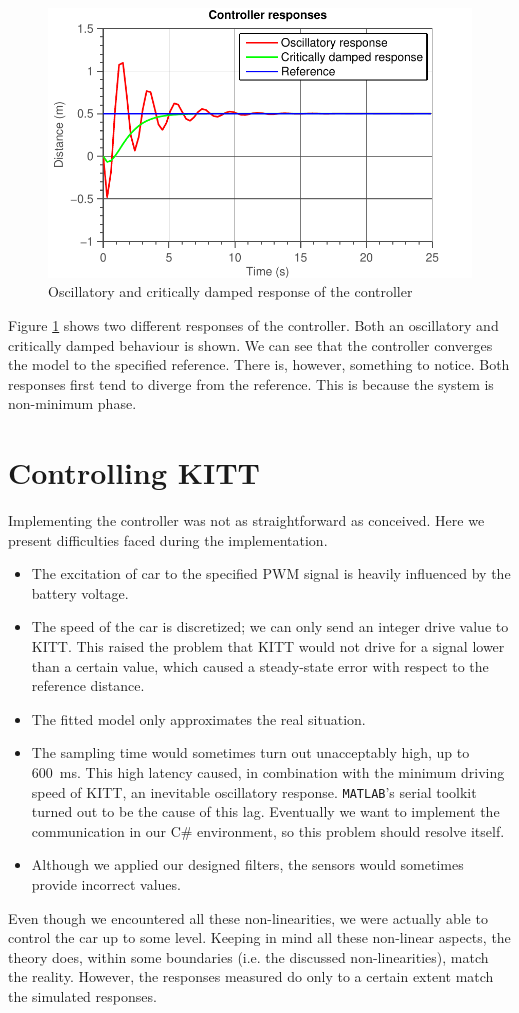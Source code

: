 \documentclass[11pt,titlepage]{report}
\begin{document}
\begin{figure}[H]
	\begin{center}
		\includegraphics[width=0.7\linewidth]{resource/controller.pdf}
	\end{center}
	\caption{Oscillatory and critically damped response of the controller}
	\label{fig:ass-2-controller-response}
\end{figure}

Figure \ref{fig:ass-2-controller-response} shows two different responses of the controller. Both an oscillatory and critically damped behaviour is shown. We can see that the controller converges the model to the specified reference. There is, however, something to notice. Both responses first tend to diverge from the reference. This is because the system is non-minimum phase.

\section{Controlling KITT}
Implementing the controller was not as straightforward as conceived. Here we present difficulties faced during the implementation.
\begin{itemize}
	\item The excitation of car to the specified PWM signal is heavily influenced by the battery voltage.
	\item The speed of the car is discretized; we can only send an integer drive value to KITT. This raised the problem that KITT would not drive for a signal lower than a certain value, which caused a steady-state error with respect to the reference distance.
	\item The fitted model only approximates the real situation.
	\item The sampling time would sometimes turn out unacceptably high, up to \SI{600}{ms}. This high latency caused, in combination with the minimum driving speed of KITT, an inevitable oscillatory response. \texttt{MATLAB}'s serial toolkit turned out to be the cause of this lag. Eventually we want to implement the communication in our C\# environment, so this problem should resolve itself.
	\item Although we applied our designed filters, the sensors would sometimes provide incorrect values.
\end{itemize}
Even though we encountered all these non-linearities, we were actually able to control the car up to some level. Keeping in mind all these non-linear aspects, the theory does, within some boundaries (i.e. the discussed non-linearities), match the reality. However, the responses measured do only to a certain extent match the simulated responses.
\end{document}
